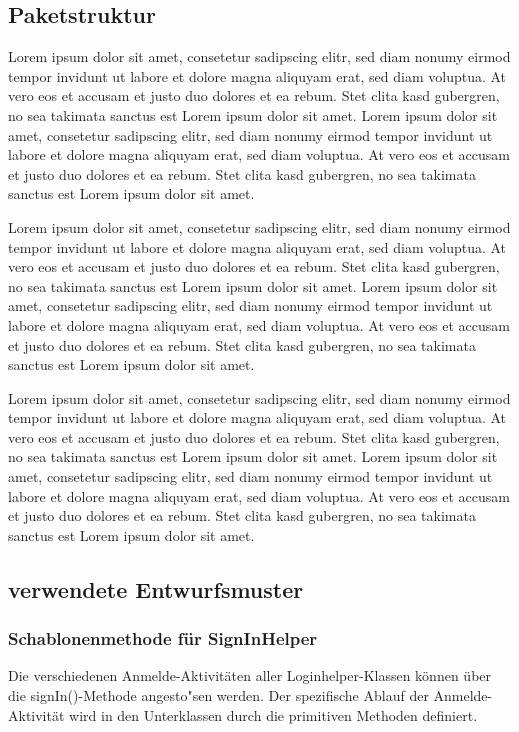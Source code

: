\documentclass[11pt,a4paper]{report}
\begin{document}
\subsection{Paketstruktur}

Lorem ipsum dolor sit amet, consetetur sadipscing elitr, sed diam nonumy eirmod tempor invidunt ut labore et dolore magna aliquyam erat, sed diam voluptua. At vero eos et accusam et justo duo dolores et ea rebum. Stet clita kasd gubergren, no sea takimata sanctus est Lorem ipsum dolor sit amet. Lorem ipsum dolor sit amet, consetetur sadipscing elitr, sed diam nonumy eirmod tempor invidunt ut labore et dolore magna aliquyam erat, sed diam voluptua. At vero eos et accusam et justo duo dolores et ea rebum. Stet clita kasd gubergren, no sea takimata sanctus est Lorem ipsum dolor sit amet.

Lorem ipsum dolor sit amet, consetetur sadipscing elitr, sed diam nonumy eirmod tempor invidunt ut labore et dolore magna aliquyam erat, sed diam voluptua. At vero eos et accusam et justo duo dolores et ea rebum. Stet clita kasd gubergren, no sea takimata sanctus est Lorem ipsum dolor sit amet. Lorem ipsum dolor sit amet, consetetur sadipscing elitr, sed diam nonumy eirmod tempor invidunt ut labore et dolore magna aliquyam erat, sed diam voluptua. At vero eos et accusam et justo duo dolores et ea rebum. Stet clita kasd gubergren, no sea takimata sanctus est Lorem ipsum dolor sit amet.

Lorem ipsum dolor sit amet, consetetur sadipscing elitr, sed diam nonumy eirmod tempor invidunt ut labore et dolore magna aliquyam erat, sed diam voluptua. At vero eos et accusam et justo duo dolores et ea rebum. Stet clita kasd gubergren, no sea takimata sanctus est Lorem ipsum dolor sit amet. Lorem ipsum dolor sit amet, consetetur sadipscing elitr, sed diam nonumy eirmod tempor invidunt ut labore et dolore magna aliquyam erat, sed diam voluptua. At vero eos et accusam et justo duo dolores et ea rebum. Stet clita kasd gubergren, no sea takimata sanctus est Lorem ipsum dolor sit amet.


\subsection{verwendete Entwurfsmuster}

\subsubsection{Schablonenmethode für SignInHelper}
Die verschiedenen Anmelde-Aktivitäten aller Loginhelper-Klassen können über die signIn()-Methode angesto"sen werden. Der spezifische Ablauf der Anmelde-Aktivität wird in den Unterklassen durch die primitiven Methoden definiert. \\
\end{document}
